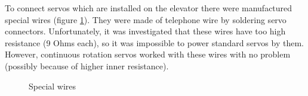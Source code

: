 To connect servos which are installed on the elevator there were manufactured special wires (figure \ref{Wiring1.1}). They were made of telephone wire by soldering servo connectors. Unfortunately, it was investigated that these wires have too high resistance (9 Ohms each), so it was impossible to power standard servos by them. However, continuous rotation servos worked with these wires with no problem (possibly because of higher inner resistance).

\begin{figure}[H]
	\begin{minipage}[h]{1\linewidth}
		\caption{Special wires}
		\label{Wiring1.1}
	\end{minipage}
\end{figure}